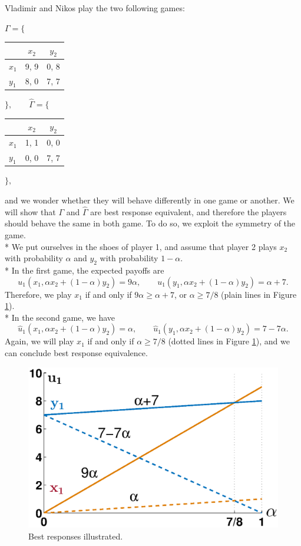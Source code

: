 \begin{example}
Vladimir and Nikos play the two following games:

\begin{center}
$\Gamma = \Bigg \{ $
\begin{tabular}{l|cc}
 & $x_2$ & $y_2$  \\
\hline
$x_1$ & 9, 9 & 0, 8 \\
$y_1$ & 8, 0 & 7, 7
\end{tabular} $\Bigg \}, \qquad \hat{\Gamma} =  \Bigg \{  $
\begin{tabular}{l|cc}
  & $x_2$ & $y_2$  \\
\hline
$x_1$ & 1, 1 & 0, 0 \\
$y_1$ & 0, 0 & 7, 7
\end{tabular}
$\Bigg \},$
\end{center}
and we wonder whether they will behave differently in one game or another. We will show that $\Gamma$ and $\hat \Gamma$ are best response equivalent, and therefore the players should behave the same in both game. To do so, we exploit the symmetry of the game.\\*
We put ourselves in the shoes of player 1, and assume that player 2 plays $x_2$ with probability $\alpha$ and $y_2$ with probability $1-\alpha$.\\*
In the first game, the expected payoffs are
$$u_1(x_1, \alpha x_2 + (1-\alpha) y_2) = 9 \alpha, \qquad u_1(y_1, \alpha x_2 + (1-\alpha) y_2) =  \alpha + 7. $$
Therefore, we play $x_1$ if and only if $9\alpha \geq \alpha + 7$, or $\alpha \geq 7/8$ (plain lines in Figure \ref{chap2:breq}).\\*
In the second game, we have
$$\hat{u}_1(x_1, \alpha x_2 + (1-\alpha) y_2) =  \alpha, \qquad \hat{u}_1(y_1, \alpha x_2 + (1-\alpha) y_2) =   7 - 7\alpha. $$
Again, we will play $x_1$ if and only if $\alpha \geq 7/8$ (dotted lines in Figure \ref{chap2:breq}),
and we can conclude best response equivalence.
\begin{figure}[!ht]
\centering
\includegraphics[width=0.5 \textwidth]{breq.eps}
\caption{Best responses illustrated.}
\label{chap2:breq}
\end{figure}
\end{example}



